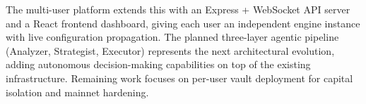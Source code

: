 \documentclass[12pt,a4paper]{article}
\begin{document}
The multi-user platform extends this with an Express + WebSocket API server and a React frontend dashboard, giving each user an independent engine instance with live configuration propagation. The planned three-layer agentic pipeline (Analyzer, Strategist, Executor) represents the next architectural evolution, adding autonomous decision-making capabilities on top of the existing infrastructure. Remaining work focuses on per-user vault deployment for capital isolation and mainnet hardening.
\end{document}
